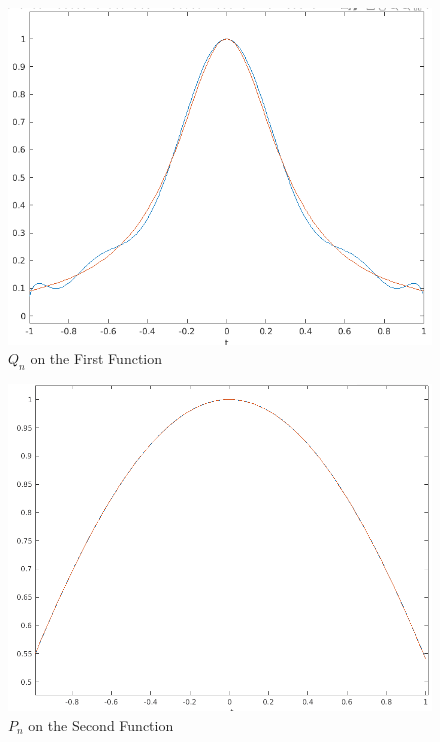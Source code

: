 \documentclass{article}
\begin{document}
\begin{figure}
\caption{$Q_n$ on the First Function}
\centering
\includegraphics[scale=.4]{hw_7_plot_g2}
\end{figure}

\begin{figure}
\caption{$P_n$ on the Second Function}
\centering
\includegraphics[scale=.4]{hw_7_plot_f1}
\end{figure}
\end{document}
